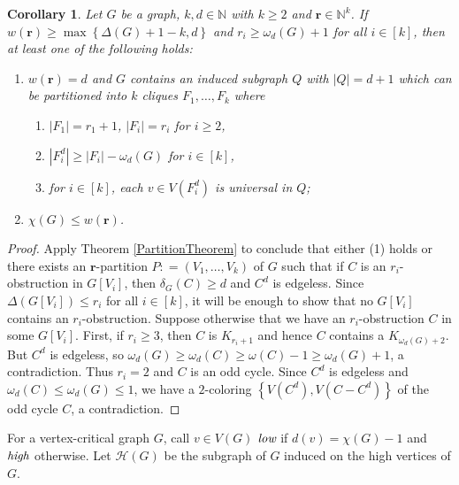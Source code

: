 \documentclass[12pt]{amsart}
\theoremstyle{plain}
\newtheorem{cor}[thm]{Corollary}
\theoremstyle{definition}
\theoremstyle{remark}
\newcommand{\fancy}[1]{\mathcal{#1}}
\newcommand{\IN}{\mathbb{N}}
\newcommand{\set}[1]{\left\{ #1 \right\}}
\newcommand{\card}[1]{\left|#1\right|}
\newcommand{\irange}[1]{\left[#1\right]}
\newcommand{\parens}[1]{\left( #1 \right)}
\newcommand{\DefinedAs}{\mathrel{\mathop:}=}
\newcommand{\mov}[2]{#1^{#2}}
\newcommand{\wt}[1]{w\parens{#1}}
\renewcommand{\vec}[1]{\mathbf{#1}}
\begin{document}
	\begin{cor}\label{FirstColoringCorollary}
	Let $G$ be a graph, $k,d \in \IN$ with $k \geq 2$ and $\vec{r} \in \IN^k$.  If
	$\wt{\vec{r}} \geq \max\set{\Delta(G) + 1 - k, d}$ and $r_i \geq \omega_d(G)
	+ 1$ for all $i \in \irange{k}$, then at least one of the following holds:
			\begin{enumerate}
           \item $\wt{\vec{r}} = d$ and $G$ contains an induced subgraph $Q$ with $\card{Q} = d+1$ which can be partitioned into $k$ cliques $F_1, \ldots, F_k$ where 
					\begin{enumerate}
					\item $\card{F_1} = r_1 + 1$, $\card{F_i} = r_i$ for $i \geq 2$,
					\item $\card{F_i^d} \geq \card{F_i} - \omega_d(G)$ for $i \in \irange{k}$,
					\item for $i \in \irange{k}$, each $v \in V(F_i^d)$ is universal in $Q$;
					\end{enumerate}
			  \item $\chi(G) \leq \wt{\vec{r}}$. 
			\end{enumerate}
	\end{cor}
	\begin{proof}
		Apply Theorem \ref{PartitionTheorem} to conclude that either (1) holds or there exists an $\vec{r}$-partition $P \DefinedAs \parens{V_1, \ldots, V_k}$ of 	
$G$ such that if $C$ is an $r_i$-obstruction in $G[V_i]$, then $\delta_G(C) \geq
d$ and $\mov{C}{d}$ is edgeless.  Since $\Delta(G[V_i]) \leq r_i$ for all $i
\in \irange{k}$, it will be enough to show that no $G[V_i]$ contains an
$r_i$-obstruction.  Suppose otherwise that we have an $r_i$-obstruction $C$ in
some $G[V_i]$.  First, if $r_i \geq 3$, then $C$ is $K_{r_i + 1}$ and hence $C$
contains a $K_{\omega_d(G) + 2}$.  But $\mov{C}{d}$ is edgeless, so
$\omega_d(G) \geq \omega_d(C) \geq \omega(C) - 1 \geq \omega_d(G) + 1$, a contradiction.  Thus $r_i = 2$ and $C$ is an
odd cycle.  Since $\mov{C}{d}$ is edgeless and $\omega_d(C) \leq \omega_d(G) \leq 1$, we have a $2$-coloring $\set{V(\mov{C}{d}), V(C - \mov{C}{d})}$ of the odd cycle $C$, a contradiction.
	\end{proof}

	For a vertex-critical graph $G$, call $v \in V(G)$	$\emph{low}$ if $d(v) = \chi(G) - 1$ and $\emph{high}$ otherwise. 
	Let $\fancy{H}(G)$ be the subgraph of $G$ induced on the high vertices of $G$.
	
\end{document}
